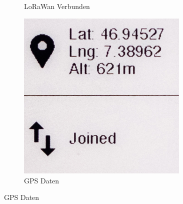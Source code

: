 \documentclass[11pt,english,german]{report}
\theoremstyle{definition}
\begin{document}
\begin{figure}[H]
\begin{subfigure}{.33\textwidth}
		\caption[Bildschirm - LoRaWan Verbunden]
		{LoRaWan Verbunden}
	\end{subfigure}%
	\begin{subfigure}{.33\textwidth}
		\centering
		\includegraphics[width=0.9\textwidth]{img/prototype/dashboard_gps.jpg}
		\caption[Bildschirm - GPS Daten]
		{GPS Daten}
	\end{subfigure}%
\end{figure}
\end{document}
